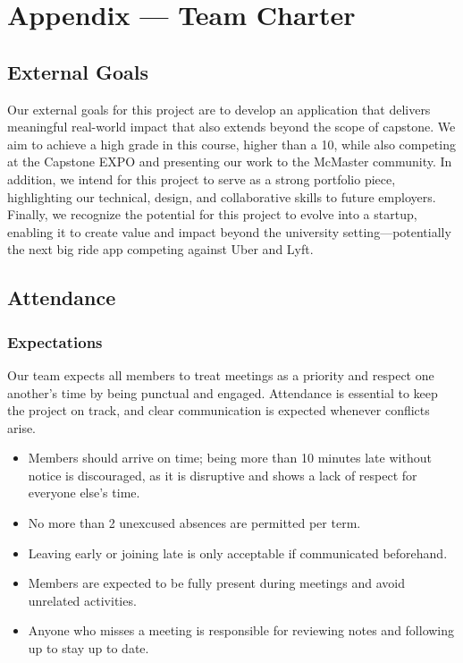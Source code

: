 \documentclass{article}
\begin{document}
\newpage{}

\section*{Appendix --- Team Charter}

\subsection*{External Goals}

Our external goals for this project are to develop an application that delivers meaningful real-world impact that also extends beyond the scope of capstone. We aim to achieve a high grade in this course, higher than a 10, while also competing at the Capstone EXPO and presenting our work to the McMaster community. In addition, we intend for this project to serve as a strong portfolio piece, highlighting our technical, design, and collaborative skills to future employers. Finally, we recognize the potential for this project to evolve into a startup, enabling it to create value and impact beyond the university setting—potentially the next big ride app competing against Uber and Lyft.

\subsection*{Attendance}

\subsubsection*{Expectations}

Our team expects all members to treat meetings as a priority and respect one another’s time by being punctual and engaged. Attendance is essential to keep the project on track, and clear communication is expected whenever conflicts arise.

\begin{itemize}
    \item Members should arrive on time; being more than 10 minutes late without notice is discouraged, as it is disruptive and shows a lack of respect for everyone else’s time.
    \item No more than 2 unexcused absences are permitted per term.
    \item Leaving early or joining late is only acceptable if communicated beforehand.
    \item Members are expected to be fully present during meetings and avoid unrelated activities.
    \item Anyone who misses a meeting is responsible for reviewing notes and following up to stay up to date.
\end{itemize}
\end{document}
